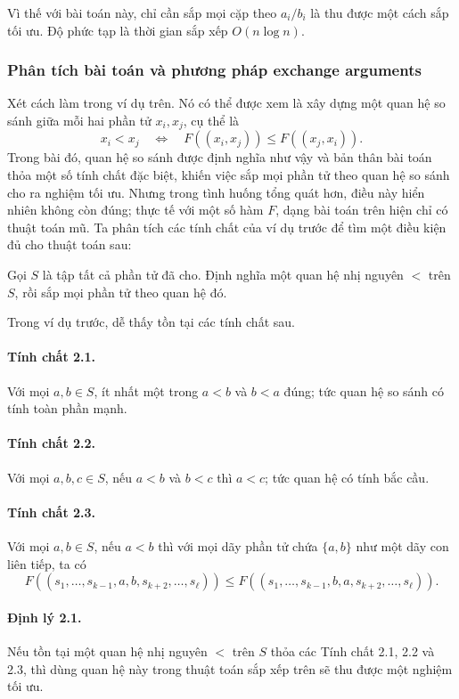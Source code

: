 \documentclass[11pt]{article}
\begin{document}
Vì thế với bài toán này, chỉ cần sắp mọi cặp theo $a_i/b_i$ là thu được một cách
sắp tối ưu. Độ phức tạp là thời gian sắp xếp $O(n\log n)$.

\subsubsection{Phân tích bài toán và phương pháp exchange arguments}

Xét cách làm trong ví dụ trên. Nó có thể được xem là xây dựng một quan hệ so
sánh giữa mỗi hai phần tử $x_i,x_j$, cụ thể là
\[
  x_i<x_j \quad\Longleftrightarrow\quad F((x_i,x_j))\le F((x_j,x_i)).
\]
Trong bài đó, quan hệ so sánh được định nghĩa như vậy và bản thân bài toán thỏa
một số tính chất đặc biệt, khiến việc sắp mọi phần tử theo quan hệ so sánh cho
ra nghiệm tối ưu. Nhưng trong tình huống tổng quát hơn, điều này hiển nhiên
không còn đúng; thực tế với một số hàm $F$, dạng bài toán trên hiện chỉ có
thuật toán mũ. Ta phân tích các tính chất của ví dụ trước để tìm một điều kiện
đủ cho thuật toán sau:

Gọi $S$ là tập tất cả phần tử đã cho. Định nghĩa một quan hệ nhị nguyên $<$ trên
$S$, rồi sắp mọi phần tử theo quan hệ đó.

Trong ví dụ trước, dễ thấy tồn tại các tính chất sau.

\paragraph{Tính chất 2.1.}
Với mọi $a,b\in S$, ít nhất một trong $a<b$ và $b<a$ đúng; tức quan hệ so sánh
có tính toàn phần mạnh.

\paragraph{Tính chất 2.2.}
Với mọi $a,b,c\in S$, nếu $a<b$ và $b<c$ thì $a<c$; tức quan hệ có tính bắc cầu.

\paragraph{Tính chất 2.3.}
Với mọi $a,b\in S$, nếu $a<b$ thì với mọi dãy phần tử chứa $\{a,b\}$ như một
dãy con liên tiếp, ta có
\[
  F((s_1,\ldots,s_{k-1},a,b,s_{k+2},\ldots,s_\ell))
  \le
  F((s_1,\ldots,s_{k-1},b,a,s_{k+2},\ldots,s_\ell)).
\]

\paragraph{Định lý 2.1.}
Nếu tồn tại một quan hệ nhị nguyên $<$ trên $S$ thỏa các Tính chất
2.1, 2.2 và 2.3, thì dùng quan hệ này trong thuật toán sắp xếp trên sẽ thu được
một nghiệm tối ưu.
\end{document}
